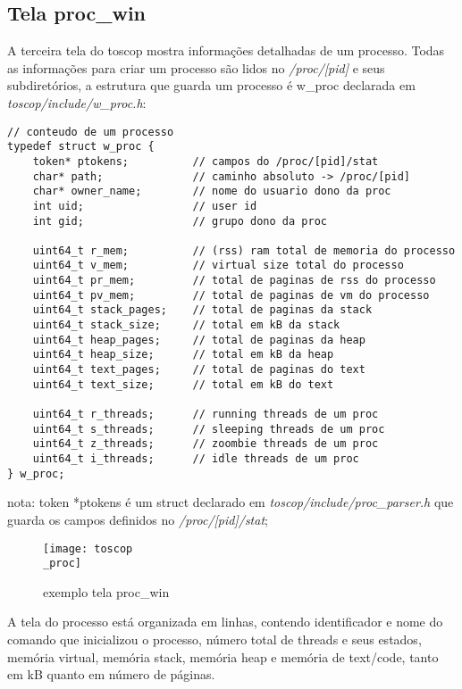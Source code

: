\documentclass{article}
\begin{document}
\subsection{Tela proc\_win}
A terceira tela do toscop mostra informações detalhadas de um processo. Todas
as informações para criar um processo são lidos no \textit{/proc/[pid]} e seus
subdiretórios, a estrutura que guarda um processo é w\_proc declarada
em \textit{toscop/include/w\_proc.h}:
\begin{verbatim}
// conteudo de um processo
typedef struct w_proc {
    token* ptokens;          // campos do /proc/[pid]/stat
    char* path;              // caminho absoluto -> /proc/[pid]
    char* owner_name;        // nome do usuario dono da proc
    int uid;                 // user id
    int gid;                 // grupo dono da proc

    uint64_t r_mem;          // (rss) ram total de memoria do processo 
    uint64_t v_mem;          // virtual size total do processo
    uint64_t pr_mem;         // total de paginas de rss do processo
    uint64_t pv_mem;         // total de paginas de vm do processo
    uint64_t stack_pages;    // total de paginas da stack
    uint64_t stack_size;     // total em kB da stack
    uint64_t heap_pages;     // total de paginas da heap
    uint64_t heap_size;      // total em kB da heap
    uint64_t text_pages;     // total de paginas do text
    uint64_t text_size;      // total em kB do text

    uint64_t r_threads;      // running threads de um proc
    uint64_t s_threads;      // sleeping threads de um proc 
    uint64_t z_threads;      // zoombie threads de um proc
    uint64_t i_threads;      // idle threads de um proc
} w_proc;
\end{verbatim}
nota: token *ptokens é um struct declarado em \textit{toscop/include/proc\_parser.h} que guarda os campos definidos no \textit{/proc/[pid]/stat};
\begin{figure}[H]
    \centering
    \texttt{[image: toscop\\\_proc]}
    \caption{exemplo tela proc\_win}
\end{figure}
A tela do processo está organizada em linhas, contendo identificador e
nome do comando que inicializou o processo, número total
de threads e seus estados, memória virtual, memória stack, memória
heap e memória de text/code, tanto em kB quanto em número de páginas.
\end{document}
